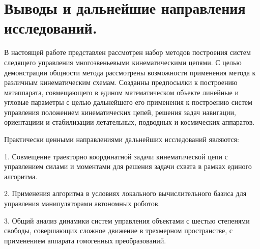 \section{Выводы и дальнейшие направления исследований.}

В настоящей работе представлен рассмотрен набор методов построения систем следящего управления многозвеньевыми кинематическими цепями. С целью демонстрации общности метода рассмотрены возможности применения метода к различным кинематическим схемам. Созданны предпосылки к построению матаппарата, совмещающего в едином математическом объекте линейные и угловые параметры с целью дальнейшего его применения к построению систем управления положением кинематических цепей, решения задач навигации, ориентациии и стабилизации летательных, подводных и космических аппаратов.

Практически ценными направлениями дальнейших исследований являются:

1. Совмещение траекторно координатной задачи кинематической цепи с управлением силами и моментами для решения задачи схвата в рамках единого алгоритма. 

2. Применения алгоритма в условиях локального вычислительного базиса для управления манипуляторами автономных роботов.

3. Общий анализ динамики систем управления объектами с шестью степенями свободы, совершающих сложное движение в трехмерном пространстве, с применением аппарата гомогенных преобразований.
